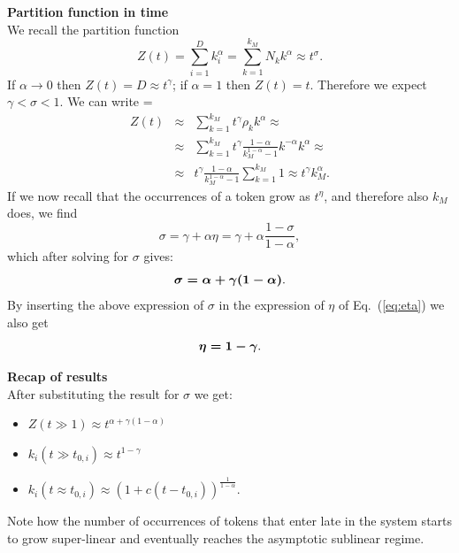 \documentclass[draft,final]{vutinfth} %
\begin{document}
\vspace{1mm}\noindent\textbf{Partition function in time}\\
We recall the partition function
\begin{equation}
    Z(t) = \sum_{i=1}^D k_i^\alpha = 
        \sum_{k=1}^{k_M} N_k k^\alpha \approx t^\sigma.
\end{equation}
If $\alpha \rightarrow 0$ then $Z(t)=D\approx t^\gamma$; if $\alpha=1$ then $Z(t)=t$.
Therefore we expect $\gamma<\sigma<1$.
We can write
{\everymath={\displaystyle}
\begin{equation}
\begin{array}{lll}
Z(t) & \approx &
        \sum_{k=1}^{k_M} t^\gamma \rho_k k^\alpha \approx \\
     & \approx &
        \sum_{k=1}^{k_M} t^\gamma \frac{1-\alpha}{k_M^{1-\alpha}-1} k^{-\alpha} k^\alpha \approx    \\
     & \approx &
        t^\gamma \frac{1-\alpha}{k_M^{1-\alpha}-1} \sum_{k=1}^{k_M} 1\approx
        t^\gamma k_M^\alpha.
\end{array}
\end{equation}
}
If we now recall that the occurrences of a token grow as $t^\eta$, and therefore also  $k_M$ does, we find
\begin{equation}
    \sigma = \gamma+\alpha\eta = \gamma+\alpha\frac{1-\sigma}{1-\alpha},
\end{equation}
which after solving for $\sigma$ gives:
\begin{equation}
    \mbox{\boldmath $\sigma=\alpha+\gamma(1-\alpha)$}.
\end{equation}
By inserting the above expression of $\sigma$ in the expression of $\eta$ of Eq.~(\ref{eq:eta}) we also get
\begin{equation}
    \mbox{\boldmath $\eta= 1-\gamma$}.
\end{equation}

\vspace{1mm}\noindent\textbf{Recap of results}\\
After substituting the result for $\sigma$ we get:
\begin{itemize}
    \item $Z(t\gg 1) \approx t^{\alpha+\gamma(1-\alpha)}$
    \item $k_i(t\gg t_{0,i}) \approx t^{1-\gamma}$
    \item $k_i(t \approx t_{0,i}) \approx (1+c(t-t_{0,i}))^\frac{1}{1-\alpha}$.
\end{itemize}
Note how the number of occurrences of tokens that enter late in the system starts to grow super-linear and eventually reaches the asymptotic sublinear regime.
\end{document}
